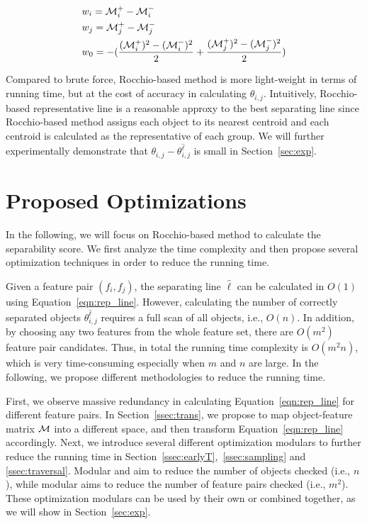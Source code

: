 \begin{equation}\label{eqn:rep_line}
\begin{split}
& w_i = \mm_i^+-\mm_i^- \\
& w_j = \mm_j^+-\mm_j^- \\
& w_0 = -(\frac{(\mm_i^+)^2-(\mm_i^-)^2}{2}+\frac{(\mm_j^+)^2-(\mm_j^-)^2}{2})
\end{split}
\end{equation}


 Compared to brute force, Rocchio-based method is more light-weight in terms of running time, but at the cost of accuracy in calculating $\theta_{i,j}$. Intuitively, Rocchio-based representative line is a reasonable approxy to the best separating line since Rocchio-based method assigns each object to its nearest centroid and each centroid is calculated as the representative of each group. We will further experimentally demonstrate that $\theta_{i,j}-\theta_{i,j}^{\hat{\ell}}$ is small in Section~\ref{sec:exp}.

\section{Proposed Optimizations}\label{sec:opt}
In the following, we will focus on Rocchio-based method to calculate the separability score. We first analyze the time complexity and then propose several optimization techniques in order to reduce the running time. 

 Given a feature pair $(f_i, f_j)$, the separating line $\hat{\ell}$ can be calculated in $O(1)$ using Equation~\ref{eqn:rep_line}. However, calculating the number of correctly separated objects $\theta_{i,j}^{\hat{\ell}}$ requires a full scan of all objects, i.e., $O(n)$. In addition, by choosing any two features from the whole feature set, there are $O(m^2)$ feature pair candidates. Thus, in total the running time complexity is $O(m^2n)$, which is very time-consuming especially when $m$ and $n$ are large. In the following, we propose different methodologies to reduce the running time.

First, we observe massive redundancy in calculating Equation~\ref{eqn:rep_line} for different feature pairs. In Section~\ref{ssec:trans}, we propose to map object-feature matrix $\mm$ into a different space, and then transform Equation~\ref{eqn:rep_line} accordingly. Next, we introduce several different optimization modulars to further reduce the running time in Section~\ref{ssec:earlyT},~\ref{ssec:sampling} and \ref{ssec:traversal}. Modular \earlyT and \sampling aim to reduce the number of objects checked (i.e., $n$), while modular \traversal aims to reduce the number of feature pairs checked (i.e., $m^2$). These optimization modulars can be used by their own or combined together, as we will show in Section~\ref{sec:exp}. 

